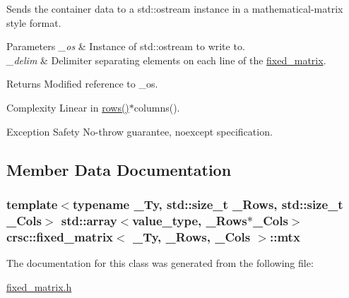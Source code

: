 Sends the container data to a {\ttfamily std\+::ostream} instance in a mathematical-\/matrix style format. 


\begin{DoxyParams}{Parameters}
{\em \+\_\+os} & Instance of {\ttfamily std\+::ostream} to write to. \\
\hline
{\em \+\_\+delim} & Delimiter separating elements on each line of the {\ttfamily \hyperlink{classcrsc_1_1fixed__matrix}{fixed\+\_\+matrix}}. \\
\hline
\end{DoxyParams}
\begin{DoxyReturn}{Returns}
Modified reference to {\ttfamily \+\_\+os}. 
\end{DoxyReturn}
\begin{DoxyParagraph}{Complexity}
Linear in {\ttfamily \hyperlink{classcrsc_1_1fixed__matrix_aa268a5792930beef7eff8fdfdd46581e}{rows()}$\ast$columns()}. 
\end{DoxyParagraph}
\begin{DoxyParagraph}{Exception Safety}
No-\/throw guarantee, {\ttfamily noexcept} specification. 
\end{DoxyParagraph}


\subsection{Member Data Documentation}
\subsubsection[{\texorpdfstring{mtx}{mtx}}]{\setlength{\rightskip}{0pt plus 5cm}template$<$typename \+\_\+\+Ty, std\+::size\+\_\+t \+\_\+\+Rows, std\+::size\+\_\+t \+\_\+\+Cols$>$ std\+::array$<${\bf value\+\_\+type}, \+\_\+\+Rows$\ast$\+\_\+\+Cols$>$ {\bf crsc\+::fixed\+\_\+matrix}$<$ \+\_\+\+Ty, \+\_\+\+Rows, \+\_\+\+Cols $>$\+::mtx\hspace{0.3cm}{\ttfamily [private]}}\hypertarget{classcrsc_1_1fixed__matrix_a2d3a7929f00a812a3241729ab477ea54}{}\label{classcrsc_1_1fixed__matrix_a2d3a7929f00a812a3241729ab477ea54}


The documentation for this class was generated from the following file\+:\begin{DoxyCompactItemize}
\item 
\hyperlink{fixed__matrix_8h}{fixed\+\_\+matrix.\+h}\end{DoxyCompactItemize}
